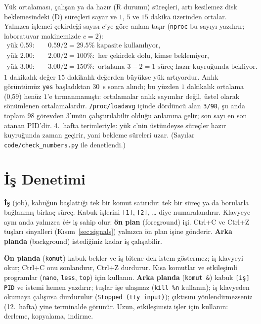 \documentclass[11pt,a4paper]{article}
\newcommand{\term}[1]{\textbf{\color{mintdeep}#1}}
\newcommand{\cmd}[1]{\texttt{#1}}
\begin{document}
\begin{example}
Yük ortalaması, çalışan ya da hazır (R durumu) süreçleri, artı kesilemez disk beklemesindeki (D) süreçleri sayar ve $1$, $5$ ve $15$ dakika üzerinden ortalar. Yalnızca işlemci çekirdeği sayısı $c$'ye göre anlam taşır (\cmd{nproc} bu sayıyı yazdırır; laboratuvar makinemizde $c = 2$):
\begin{align*}
\text{yük } 0.59: &\quad 0.59 / 2 = 29.5\% \text{ kapasite kullanılıyor,}\\
\text{yük } 2.00: &\quad 2.00 / 2 = 100\%: \text{ her çekirdek dolu, kimse beklemiyor,}\\
\text{yük } 3.00: &\quad 3.00 / 2 = 150\%: \text{ ortalama } 3 - 2 = 1 \text{ süreç hazır kuyruğunda bekliyor.}
\end{align*}
$1$ dakikalık değer $15$ dakikalık değerden büyükse yük artıyordur. Anlık görüntümüz \cmd{yes} başladıktan $30$~s sonra alındı; bu yüzden $1$ dakikalık ortalama (0,59) henüz $1$'e tırmanmamıştı: ortalamalar anlık sayımlar değil, üstel olarak sönümlenen ortalamalardır. \texttt{/proc/loadavg} içinde dördüncü alan \texttt{3/98}, şu anda toplam $98$ görevden $3$'ünün çalıştırılabilir olduğu anlamına gelir; son sayı en son atanan PID'dir. 4.~hafta terimleriyle: yük $c$'nin üstündeyse süreçler hazır kuyruğunda zaman geçirir, yani bekleme süreleri uzar. (Sayılar \texttt{code/check\_numbers.py} ile denetlendi.)
\end{example}

\section{İş Denetimi}
\label{sec:jobs}

\term{İş} (job), kabuğun başlattığı tek bir komut satırıdır: tek bir süreç ya da borularla bağlanmış birkaç süreç. Kabuk işlerini \texttt{[1]}, \texttt{[2]}, \dots{} diye numaralandırır. Klavyeye aynı anda yalnızca \emph{bir} iş sahip olur: \term{ön plan} (foreground) işi. Ctrl+C ve Ctrl+Z tuşları sinyalleri (Kısım~\ref{sec:signals}) yalnızca ön plan işine gönderir. \term{Arka planda} (background) istediğiniz kadar iş çalışabilir.

\textbf{Ön planda} (\texttt{komut}) kabuk bekler ve iş bitene dek istem göstermez; iş klavyeyi okur; Ctrl+C onu sonlandırır, Ctrl+Z durdurur. Kısa komutlar ve etkileşimli programlar (\cmd{nano}, \cmd{less}, \cmd{top}) için kullanın. \textbf{Arka planda} (\texttt{komut \&}) kabuk \texttt{[iş] PID} ve istemi hemen yazdırır; tuşlar işe ulaşmaz (\cmd{kill \%n} kullanın); iş klavyeden okumaya çalışırsa durdurulur (\texttt{Stopped (tty input)}); çıktısını yönlendirmezseniz (12.~hafta) yine terminalde görünür. Uzun, etkileşimsiz işler için kullanın: derleme, kopyalama, indirme.
\end{document}
